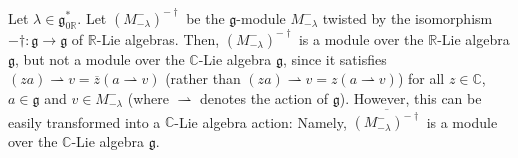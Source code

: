 \documentclass[etingof-lie.tex]{subfiles}
\begin{document}
Let $\lambda\in\mathfrak{g}_{0\mathbb{R}}^{\ast}$. Let $\left(  M_{-\lambda
}^{-}\right)  ^{-\dag}$ be the $\mathfrak{g}$-module $M_{-\lambda}^{-}$
twisted by the isomorphism $-\dag:\mathfrak{g}\rightarrow\mathfrak{g}$ of
$\mathbb{R}$-Lie algebras. Then, $\left(  M_{-\lambda}^{-}\right)  ^{-\dag}$
is a module over the $\mathbb{R}$-Lie algebra $\mathfrak{g}$, but not a module
over the $\mathbb{C}$-Lie algebra $\mathfrak{g}$, since it satisfies $\left(
za\right)  \rightharpoonup v=\overline{z}\left(  a\rightharpoonup v\right)  $
(rather than $\left(  za\right)  \rightharpoonup v=z\left(  a\rightharpoonup
v\right)  $) for all $z\in\mathbb{C}$, $a\in\mathfrak{g}$ and $v\in
M_{-\lambda}^{-}$ (where $\rightharpoonup$ denotes the action of
$\mathfrak{g}$). However, this can be easily transformed into a $\mathbb{C}%
$-Lie algebra action: Namely, $\overline{\left(  M_{-\lambda}^{-}\right)
^{-\dag}}$ is a module over the $\mathbb{C}$-Lie algebra $\mathfrak{g}$.
\end{document}
